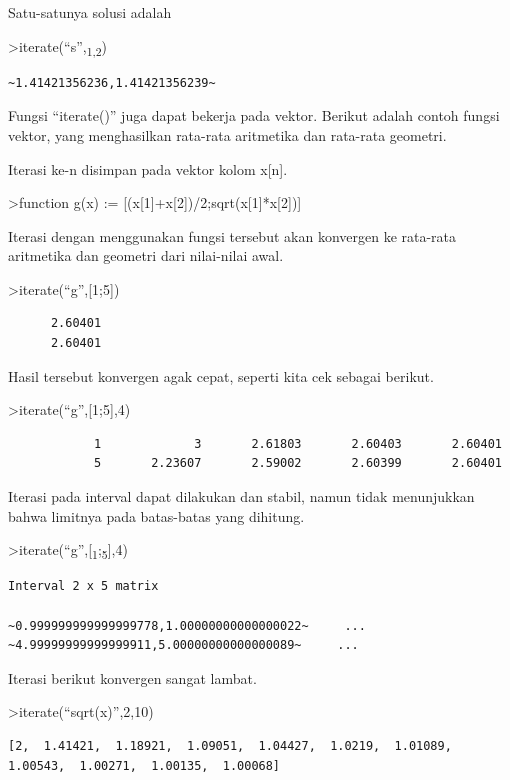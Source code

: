 \documentclass[
]{book}
\begin{document}
Satu-satunya solusi adalah

\textgreater iterate(``s'',\textsubscript{1,2})

\begin{verbatim}
~1.41421356236,1.41421356239~
\end{verbatim}

Fungsi ``iterate()'' juga dapat bekerja pada vektor. Berikut adalah contoh fungsi vektor, yang menghasilkan rata-rata aritmetika dan rata-rata geometri.

Iterasi ke-n disimpan pada vektor kolom x{[}n{]}.

\textgreater function g(x) := {[}(x{[}1{]}+x{[}2{]})/2;sqrt(x{[}1{]}*x{[}2{]}){]}

Iterasi dengan menggunakan fungsi tersebut akan konvergen ke rata-rata aritmetika dan geometri dari nilai-nilai awal.

\textgreater iterate(``g'',{[}1;5{]})

\begin{verbatim}
      2.60401 
      2.60401 
\end{verbatim}

Hasil tersebut konvergen agak cepat, seperti kita cek sebagai berikut.

\textgreater iterate(``g'',{[}1;5{]},4)

\begin{verbatim}
            1             3       2.61803       2.60403       2.60401 
            5       2.23607       2.59002       2.60399       2.60401 
\end{verbatim}

Iterasi pada interval dapat dilakukan dan stabil, namun tidak menunjukkan bahwa limitnya pada batas-batas yang dihitung.

\textgreater iterate(``g'',{[}\textsubscript{1};\textsubscript{5}{]},4)

\begin{verbatim}
Interval 2 x 5 matrix

~0.999999999999999778,1.00000000000000022~     ...
~4.99999999999999911,5.00000000000000089~     ...
\end{verbatim}

Iterasi berikut konvergen sangat lambat.

\textgreater iterate(``sqrt(x)'',2,10)

\begin{verbatim}
[2,  1.41421,  1.18921,  1.09051,  1.04427,  1.0219,  1.01089,
1.00543,  1.00271,  1.00135,  1.00068]
\end{verbatim}
\end{document}

